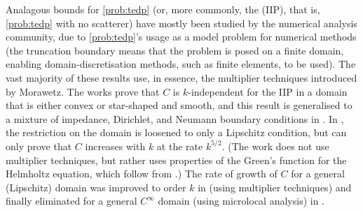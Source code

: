 
    
Analagous bounds for \cref{prob:tedp} (or, more commonly, the  (IIP), that is, \cref{prob:tedp} with no scatterer) have mostly been studied by the numerical analysis community, due to \cref{prob:tedp}'s usage as a model problem for numerical methods (the truncation boundary means that the problem is posed on a finite domain, enabling domain-discretisation methods, such as finite elements, to be used). The vast majority of these results use, in essence, the multiplier techniques introduced by Morawetz. The works \cite{Me:95,CuFe:06} prove that $C$ is $k$-independent for the IIP in a domain that is either convex or star-shaped and smooth, and this result is generalised to a mixture of impedance, Dirichlet, and Neumann boundary conditions in \cite{He:07}. In \cite{EsMe:12}, the restriction on the domain is loosened to only a Lipschitz condition, but can only prove that $C$ increases with $k$ at the rate $k^{5/2}.$ (The work \cite{EsMe:12} does not use multiplier techniques, but rather uses properties of the Green's function for the Helmholtz equation, which follow from \cite{MeSa:12}.) The rate of growth of $C$ for a general (Lipschitz) domain was improved to order $k$ in \cite{Sp:14} (using multiplier techniques) and finally eliminated for a general $C^\infty$ domain (using microlocal analysis) in \cite{BaSpWu:16}.

